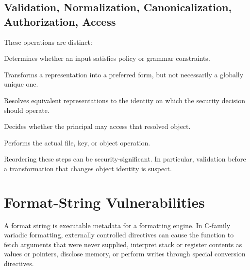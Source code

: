 \documentclass[11pt]{article}
\newcommand{\term}[1]{\textbf{#1}}
\begin{document}
\subsection{Validation, Normalization, Canonicalization, Authorization, Access}

These operations are distinct:

\begin{description}[style=nextline,leftmargin=0.22in]
  \item[\term{Validation}] Determines whether an input satisfies policy or grammar constraints.
  \item[\term{Normalization}] Transforms a representation into a preferred form, but not necessarily a globally unique one.
  \item[\term{Canonicalization}] Resolves equivalent representations to the identity on which the security decision should operate.
  \item[\term{Authorization}] Decides whether the principal may access that resolved object.
  \item[\term{Resource access}] Performs the actual file, key, or object operation.
\end{description}

Reordering these steps can be security-significant. In particular, validation before a transformation that changes object identity is suspect.

\section{Format-String Vulnerabilities}

A format string is executable metadata for a formatting engine. In C-family variadic formatting, externally controlled directives can cause the function to fetch arguments that were never supplied, interpret stack or register contents as values or pointers, disclose memory, or perform writes through special conversion directives.
\end{document}
